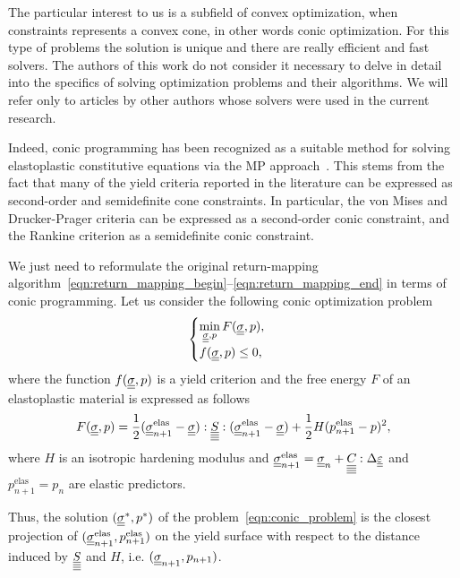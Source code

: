 \documentclass[12pt]{article}
\begin{document}
The particular interest to us is a subfield of convex optimization, when constraints represents a convex cone, in other words conic optimization. For this type of problems the solution is unique and there are really efficient and fast solvers. The authors of this work do not consider it necessary to delve in detail into the specifics of solving optimization problems and their algorithms. We will refer only to articles by other authors whose solvers were used in the current research.

Indeed, conic programming has been recognized as a suitable method for solving elastoplastic constitutive equations via the MP approach~\parencite{BRUNO2020724}. This stems from the fact that many of the yield criteria reported in the literature can be expressed as second-order and semidefinite cone constraints. In particular, the von Mises and Drucker-Prager criteria can be expressed as a second-order conic constraint, and the Rankine criterion as a semidefinite conic constraint. 

We just need to reformulate the original return-mapping algorithm~\eqref{eqn:return_mapping_begin}--\eqref{eqn:return_mapping_end} in terms of conic programming. Let us consider the following conic optimization problem
\begin{equation}
    \label{eqn:conic_problem}
    \begin{cases}
        \min\limits_{\underline{\underline{\sigma}}, p} F(\underline{\underline{\sigma}}, p), \\
        f(\underline{\underline{\sigma}}, p) \leq 0,
    \end{cases}
\end{equation}
where the function $f(\underline{\underline{\sigma}}, p)$ is a yield criterion and the free energy $F$ of an elastoplastic material is expressed as follows
\begin{equation}
    F(\underline{\underline{\sigma}}, p) = \frac{1}{2}(\underline{\underline{\sigma}}_{n+1}^{\text{elas}} - \underline{\underline{\sigma}}) : \underline{\underline{\underline{\underline{S}}}} : (\underline{\underline{\sigma}}_{n+1}^{\text{elas}} - \underline{\underline{\sigma}}) + \frac{1}{2}H(p_{n+1}^\text{elas} - p)^2,
\end{equation}
where $H$ is an isotropic hardening modulus and $\underline{\underline{\sigma}}_{n+1}^{\text{elas}} = \underline{\underline{\sigma}}_n + \underline{\underline{\underline{\underline{C_{}}}}}:\Delta\underline{\underline{\varepsilon}}$ and $p^\text{elas}_{n+1} = p_n$ are elastic predictors.

Thus, the solution $(\underline{\underline{\sigma}}^*, p^*)$ of the problem~\eqref{eqn:conic_problem} is the closest projection of $(\underline{\underline{\sigma}}_{n+1}^{\text{elas}}, p_{n+1}^\text{elas})$ on the yield surface with respect to the distance induced by $\underline{\underline{\underline{\underline{S}}}}$ and $H$, i.e. $(\underline{\underline{\sigma}}_{n+1}, p_{n+1})$.

\end{document}
